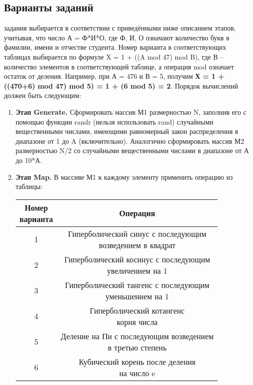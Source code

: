 { %
	\subsection{Варианты заданий}
	 задания выбирается в соответствии с приведёнными ниже описанием этапов, учитывая, что число А = Ф*И*О, где Ф, И, О означают количество букв в фамилии, имени и отчестве студента. Номер варианта в соответствующих таблицах выбирается по формуле X = 1 + ((A mod 47) mod B), где В – количество элементов в соответствующей таблице, а операция mod означает остаток от деления. Например, при А = 476 и В = 5, получим \textbf{Х = 1 + ((470+6) mod 47) mod 5) = 1 + (6 mod 5) = 2}. Порядок вычислений должен быть следующим:
	\begin{enumerate}
		\item\textbf{Этап Generate.} Сформировать массив М1 размерностью N, заполнив его с помощью функции rand\textunderscore r (нельзя использовать rand) случайными вещественными числами, имеющими равномерный закон распределения в диапазоне от 1 до A (включительно). Аналогично сформировать массив М2 размерностью N/2 со случайными вещественными числами в диапазоне от А до 10*А.
		\item\textbf{Этап Map.} В массиве М1 к каждому элементу применить операцию из таблицы:
			\begin{center}
				\begin{tabular}{|c|c|}
					\hline
					\specialcell{\textbf{Номер}\\ \textbf{варианта}} & \textbf{Операция} \\
					\hline
					1 & \specialcell{Гиперболический синус с последующим\\ возведением в квадрат} \\
					\hline
					2 & \specialcell{Гиперболический косинус с последующим\\ увеличением на 1} \\
					\hline
					3 & \specialcell{Гиперболический тангенс с последующим\\ уменьшением на 1} \\
					\hline
					4 & \specialcell{Гиперболический котангенс\\ корня числа} \\
					\hline
					5 & \specialcell{Деление на Пи с последующим возведением\\ в третью степень} \\
					\hline
					6 & \specialcell{Кубический корень после деления\\ на число e} \\

\end{tabular}
\end{center}
\end{enumerate}}
